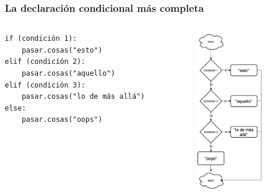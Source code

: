 \documentclass{beamer}
\begin{document}

\begin{frame}[fragile]
    \frametitle{La declaración condicional más completa}

\begin{columns}
    \begin{column}{0.5\textwidth}
        \begin{verbatim}
if (condición 1):
    pasar.cosas("esto")
elif (condición 2):
    pasar.cosas("aquello")
elif (condición 3):
    pasar.cosas("lo de más allá")
else:
    pasar.cosas("oops") 
        \end{verbatim}
    \end{column}
    \begin{column}{0.5\textwidth}
        \begin{center}
            \includegraphics[height=7cm]{figuras/flow.png}           
        \end{center}    
    \end{column}

\end{columns}
 \end{frame}

\end{document}
